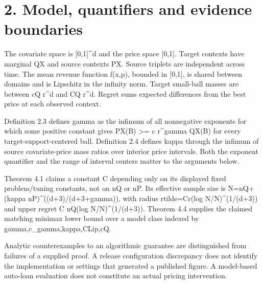 \documentclass[10pt]{article}
\begin{document}
\section*{2. Model, quantifiers and evidence boundaries}
The covariate space is [0,1]\textasciicircum{}d and the price space [0,1]. Target contexts have marginal QX and source contexts PX. Source triplets are independent across time. The mean revenue function f(x,p), bounded in [0,1], is shared between domains and is Lipschitz in the infinity norm. Target small-ball masses are between cQ r\textasciicircum{}d and CQ r\textasciicircum{}d. Regret sums expected differences from the best price at each observed context.\par
Definition 2.3 defines gamma as the infimum of all nonnegative exponents for which some positive constant gives PX(B) >= c r\textasciicircum{}gamma QX(B) for every target-support-centered ball. Definition 2.4 defines kappa through the infimum of source covariate-price mass ratios over interior price intervals. Both the exponent quantifier and the range of interval centers matter to the arguments below.\par
Theorem 4.1 claims a constant C depending only on its displayed fixed problem/tuning constants, not on nQ or nP. Its effective sample size is N=nQ+(kappa nP)\textasciicircum{}((d+3)/(d+3+gamma)), with radius rtilde=Cr(log N/N)\textasciicircum{}(1/(d+3)) and upper regret C nQ(log N/N)\textasciicircum{}(1/(d+3)). Theorem 4.4 supplies the claimed matching minimax lower bound over a model class indexed by gamma,c\_gamma,kappa,CLip,cQ.\par
Analytic counterexamples to an algorithmic guarantee are distinguished from failures of a supplied proof. A release configuration discrepancy does not identify the implementation or settings that generated a published figure. A model-based auto-loan evaluation does not constitute an actual pricing intervention.\par
\end{document}
